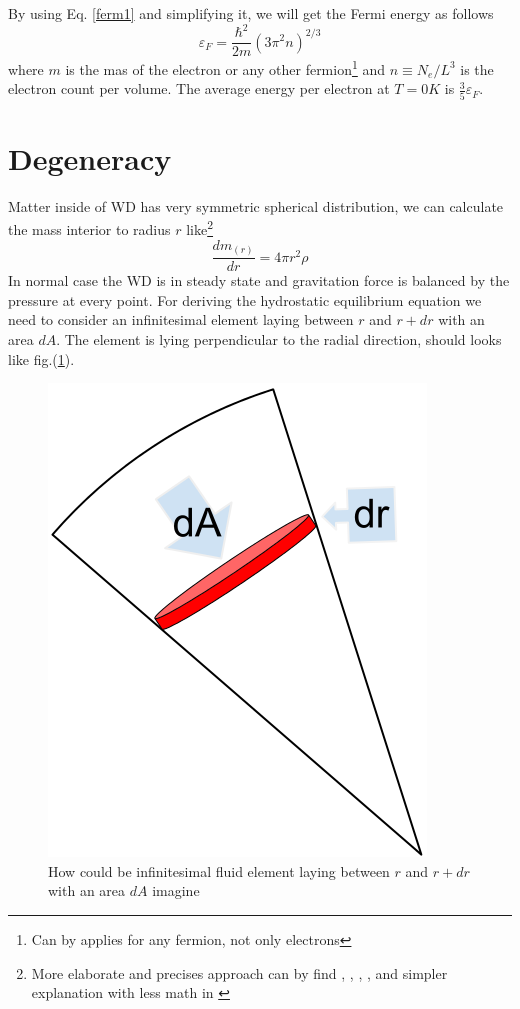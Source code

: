 \documentclass[oneside,a4paper,11pt]{report}
\begin{document}
By using Eq. \eqref{ferm1} and simplifying it, we will get the Fermi energy as follows
\begin{equation}
\varepsilon_F = \frac{\hbar^2}{2m}\left ( 3\pi^2n \right )^{2/3}
\end{equation}
where $m$ is the mas of the electron or any other fermion\footnote{Can by applies for any fermion, not only electrons} 
and $n\equiv N_e/L^3$ is the electron count per volume. 
The average energy per electron at $T = 0K$ is $\frac{3}{5}\varepsilon_F$.    
  
\section{Degeneracy}
Matter inside of WD has very symmetric spherical distribution, we can calculate the mass interior to radius $r$ like\footnote{More elaborate and precises approach can by find 
\citet{2004bhwd.book.....S}, \cite{padm_vII}, \citet{kleczek}, \citet{comp_obj1}, \citet{1972ApJ...175..417N} and simpler explanation with
less math in \citet{2007ima..book.....C}}
\begin{equation}
 \frac{dm_{(r)}}{dr} = 4 \pi r^2 \rho
\end{equation}
In normal case the WD is in steady state and gravitation force is balanced by the pressure at every point.  
For deriving the hydrostatic equilibrium equation we need to consider an infinitesimal element laying between 
$r$ and $r+dr$ with an area $dA$. The element is lying perpendicular to the radial direction, should looks like fig.(\ref{wd1}).
\begin{figure}[!hbt]
\centering
\includegraphics[totalheight=4cm]{plot/wd1}
\caption{How could be infinitesimal fluid element laying between 
$r$ and $r+dr$ with an area $dA$ imagine}
\label{wd1} 
\end{figure}
\end{document}
